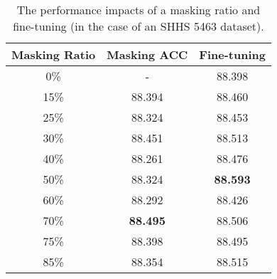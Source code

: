 \begin{table}[ht]
\centering
\caption{The performance impacts of a masking ratio and fine-tuning (in the case of an SHHS 5463 dataset).}
\label{table6}
\vspace{-5pt}
\begin{tabular}{ccc}
\hline
\textbf{Masking Ratio} & \textbf{Masking ACC} & \textbf{Fine-tuning} \\
\hline
0\% & - & 88.398 \\
15\% & 88.394 & 88.460 \\
25\% & 88.324 & 88.453 \\
30\% & 88.451 & 88.513 \\
40\% & 88.261 & 88.476 \\
50\% & 88.324 & \textbf{88.593} \\
60\% & 88.292 & 88.426 \\
70\% & \textbf{88.495} & 88.506 \\
75\% & 88.398 & 88.495 \\
85\% & 88.354 & 88.515  \\
\hline
\end{tabular}
\end{table}
